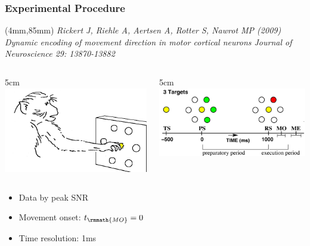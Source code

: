 \documentclass{beamer}
\newenvironment{reference}[2]{%
  \flushright\begin{textblock*}{\textwidth}(#1,#2) 
      \tiny\it\bgroup\color{gray!60!white}}{\egroup\end{textblock*}}
\begin{document}
\begin{frame}\frametitle{Experimental Procedure} 
   \begin{reference}{4mm}{85mm}
        Rickert J, Riehle A, Aertsen A, Rotter S, Nawrot MP (2009)
        Dynamic encoding of movement direction in motor cortical neurons
        Journal of Neuroscience 29: 13870-13882
   \end{reference}
 \begin{columns}
  \begin{column}{5cm}
   \includegraphics[scale=0.2]{fig/monkey.png}  
  \end{column}
  \begin{column}{5cm}
   \includegraphics[scale=0.2]{fig/directions.png}  
  \end{column}
 \end{columns}
 \begin{itemize}
   \item Data by peak SNR
   \item Movement onset: $t_\rmmath{MO}=0$
   \item Time resolution: 1ms
  \end{itemize}
\end{frame}
\end{document}
